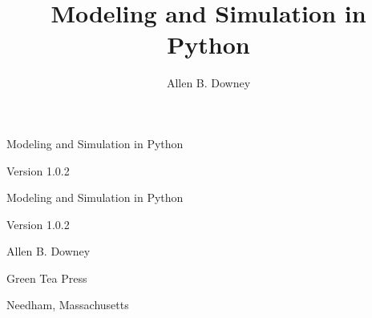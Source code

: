 \documentclass[12pt]{book}
\title{Modeling and Simulation in Python}
\author{Allen B. Downey}
\newcommand{\thetitle}{Modeling and Simulation in Python}
\newcommand{\theauthors}{Allen B. Downey}
\newcommand{\theversion}{1.0.2}
\theoremstyle{exercise}
\newcommand\blankpage{%
    \null
    \thispagestyle{empty}%
    \addtocounter{page}{-1}%
    \newpage}
\newif\ifplastex
\begin{document}
\frontmatter

\ifplastex

\maketitle

\else

\begin{latexonly}

\thispagestyle{empty}

\begin{flushright}
\vspace*{2.0in}

\begin{spacing}{3}
{\huge \thetitle}
\end{spacing}

\vspace{0.25in}

Version \theversion

\vfill

\end{flushright}


\afterpage{\blankpage}


\pagebreak
\thispagestyle{empty}

\begin{flushright}
\vspace*{2.0in}

\begin{spacing}{3}
{\huge \thetitle}
\end{spacing}

\vspace{0.25in}

Version \theversion

\vspace{1in}


{\Large
\theauthors \\
}


\vspace{0.5in}

{\Large Green Tea Press}

{\small Needham, Massachusetts}


\end{flushright}
\end{latexonly}
\end{document}
